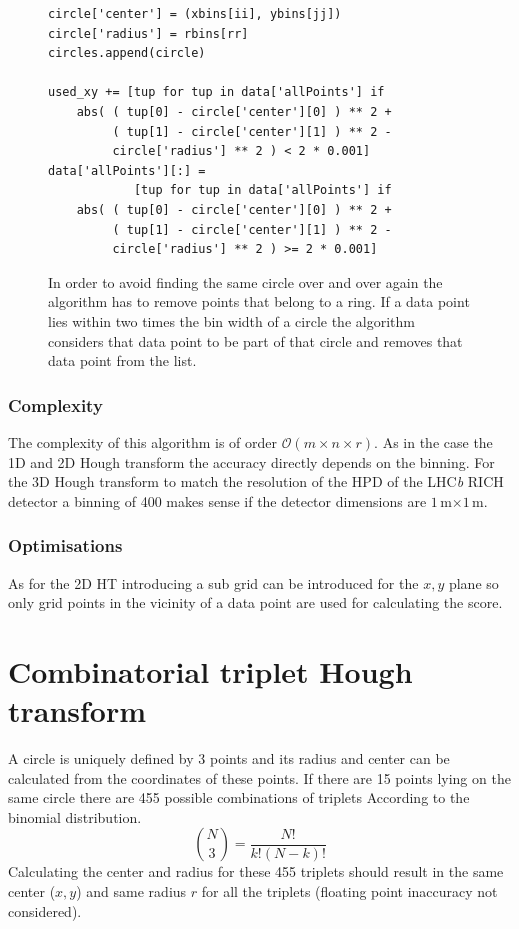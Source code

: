 \documentclass[11pt,twoside]{scrreprt}
\begin{document}
\begin{figure}[htbp]
\begin{lstlisting}
circle['center'] = (xbins[ii], ybins[jj])
circle['radius'] = rbins[rr]
circles.append(circle)

used_xy += [tup for tup in data['allPoints'] if
    abs( ( tup[0] - circle['center'][0] ) ** 2 +
         ( tup[1] - circle['center'][1] ) ** 2 -
         circle['radius'] ** 2 ) < 2 * 0.001]
data['allPoints'][:] = 
            [tup for tup in data['allPoints'] if 
    abs( ( tup[0] - circle['center'][0] ) ** 2 + 
         ( tup[1] - circle['center'][1] ) ** 2 - 
         circle['radius'] ** 2 ) >= 2 * 0.001]  
\end{lstlisting}
\caption[Remove used points]{In order to avoid finding the same circle over and over again the algorithm has to remove points that
belong to a ring. If a data point lies within two times the bin width of a circle the algorithm considers that data point to be 
part of that circle and removes that data point from the list.}
\label{pc:remove_points}
\end{figure}

\subsubsection{Complexity} %
\label{ssub:complexity}
The complexity of this algorithm is of order $\mathcal{O}(m\times n\times r)$. As in the case the 1D and 2D Hough transform the accuracy
directly depends on the binning. For the 3D Hough transform to match the resolution of the HPD of the LHC\textit{b} RICH detector a binning 
of 400 makes sense if the detector dimensions are $1$\,m$\times1$\,m.

\subsubsection{Optimisations} %
\label{ssub:optimisations}
As for the 2D HT introducing a sub grid can be introduced for the $x,y$ plane so only grid points in the vicinity of a data point are used
for calculating the score.
\clearpage
\section{Combinatorial triplet Hough transform}
\label{sec:combinatorial_approach}
A circle is uniquely defined by 3 points and its radius and center can be calculated from the coordinates of these points. If there are 
15 points lying on the same circle there are 455 possible combinations of triplets According to the binomial distribution.
\[
   \binom{N}{3} = \frac{N!}{k!(N-k)!}
 \] 
Calculating the center and radius for these 455 triplets should result in the same center ($x,y$) and same radius $r$ for all the triplets 
(floating point inaccuracy not considered). 
\end{document}
